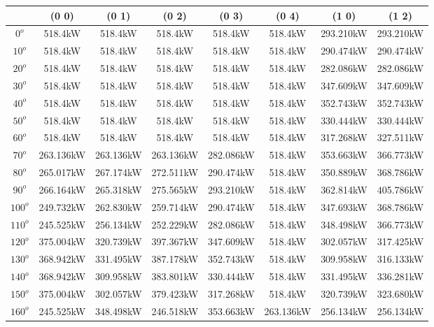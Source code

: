         \singlespacing
        \begin{table}[H]
        	\centering
        	\begin{tabular}{|c|c|c|c|c|c|c|c|} \hline
        			& (0 0)		& (0 1)		& (0 2)		& (0 3)		& (0 4)		& (1 0)		& (1 2)		\\ \hline
		$0^o$	& 518.4kW	& 518.4kW	& 518.4kW	& 518.4kW	& 518.4kW	& 293.210kW	& 293.210kW	\\ \hline
		$10^o$	& 518.4kW	& 518.4kW	& 518.4kW	& 518.4kW	& 518.4kW	& 290.474kW	& 290.474kW	\\ \hline
		$20^o$	& 518.4kW	& 518.4kW	& 518.4kW	& 518.4kW	& 518.4kW	& 282.086kW	& 282.086kW	\\ \hline
		$30^o$	& 518.4kW	& 518.4kW	& 518.4kW	& 518.4kW	& 518.4kW	& 347.609kW	& 347.609kW	\\ \hline
		$40^o$	& 518.4kW	& 518.4kW	& 518.4kW	& 518.4kW	& 518.4kW	& 352.743kW	& 352.743kW	\\ \hline
		$50^o$	& 518.4kW	& 518.4kW	& 518.4kW	& 518.4kW	& 518.4kW	& 330.444kW	& 330.444kW	\\ \hline
		$60^o$	& 518.4kW	& 518.4kW	& 518.4kW	& 518.4kW	& 518.4kW	& 317.268kW	& 327.511kW	\\ \hline
		$70^o$	& 263.136kW	& 263.136kW	& 263.136kW	& 282.086kW	& 518.4kW	& 353.663kW	& 366.773kW	\\ \hline
		$80^o$	& 265.017kW	& 267.174kW	& 272.511kW	& 290.474kW	& 518.4kW	& 350.889kW	& 368.786kW	\\ \hline
		$90^o$	& 266.164kW	& 265.318kW	& 275.565kW	& 293.210kW	& 518.4kW	& 362.814kW	& 405.786kW	\\ \hline
		$100^o$	& 249.732kW	& 262.830kW	& 259.714kW	& 290.474kW	& 518.4kW	& 347.693kW	& 368.786kW	\\ \hline
		$110^o$	& 245.525kW	& 256.134kW	& 252.229kW	& 282.086kW	& 518.4kW	& 348.498kW	& 366.773kW	\\ \hline
		$120^o$	& 375.004kW	& 320.739kW	& 397.367kW	& 347.609kW	& 518.4kW	& 302.057kW	& 317.425kW	\\ \hline
		$130^o$	& 368.942kW	& 331.495kW	& 387.178kW	& 352.743kW	& 518.4kW	& 309.958kW	& 316.133kW	\\ \hline
		$140^o$	& 368.942kW	& 309.958kW	& 383.801kW	& 330.444kW	& 518.4kW	& 331.495kW	& 336.281kW	\\ \hline
		$150^o$	& 375.004kW	& 302.057kW	& 379.423kW	& 317.268kW	& 518.4kW	& 320.739kW	& 323.680kW	\\ \hline
		$160^o$	& 245.525kW	& 348.498kW	& 246.518kW	& 353.663kW	& 263.136kW	& 256.134kW	& 256.134kW	\\ \hline

\end{tabular}
\end{table}
